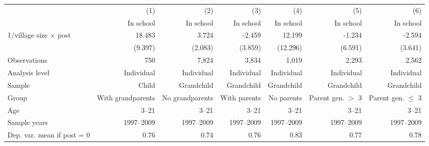 \begin{center} \begin{threeparttable} \begin{tabular}{l*{6}{r}} \hline \hline 
                    &         (1)&         (2)&         (3)&         (4)&         (5)&         (6)\\
                    &   In school&   In school&   In school&   In school&   In school&   In school\\
\hline
1/village size $\times$ post&      18.483&       3.724&      -2.459&      12.199&      -1.234&      -2.594\\
                    &     (9.397)&     (2.083)&     (3.859)&    (12.296)&     (6.591)&     (3.641)\\
\hline
Observations        &         750&       7,824&       3,834&       1,019&       2,293&       2,562\\
Analysis level      &  Individual&  Individual&  Individual&  Individual&  Individual&  Individual\\
Sample              &       Child&  Grandchild&  Grandchild&  Grandchild&  Grandchild&  Grandchild\\
Group               &With grandparents&No grandparents&With parents&  No parents&Parent gen. $>$ 3&Parent gen. $\leq$ 3\\
Age                 &       3--21&       3--21&       3--21&       3--21&       3--21&       3--21\\
Sample years        &  1997--2009&  1997--2009&  1997--2009&  1997--2009&  1997--2009&  1997--2009\\
Dep. var. mean if post = 0 &        0.76&        0.74&        0.76&        0.83&        0.77&        0.78\\
\hline \end{tabular} \end{threeparttable} \end{center}

